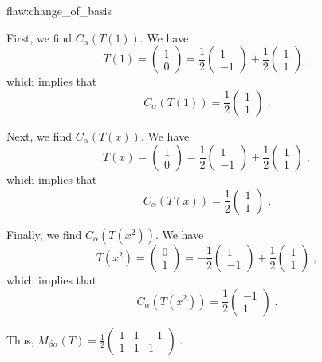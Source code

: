 \begin{flaw}{flaw:change_of_basis} %

First, we find $C_{\alpha}\left(T(1)\right)$. We have
$$T(1) = \begin{pmatrix}1 \\ 0\end{pmatrix} = \frac{1}{2}\begin{pmatrix}1 \\ -1\end{pmatrix} + \frac{1}{2}\begin{pmatrix}1 \\ 1\end{pmatrix}\;,$$
which implies that
$$C_{\alpha}\left(T(1)\right) = \frac{1}{2}\begin{pmatrix} 1 \\ 1\end{pmatrix}\;.$$

Next, we find $C_{\alpha}\left(T(x)\right)$. We have
$$T(x) = \begin{pmatrix}1 \\ 0\end{pmatrix} = \frac{1}{2}\begin{pmatrix}1 \\ -1\end{pmatrix} + \frac{1}{2}\begin{pmatrix}1 \\ 1\end{pmatrix}\;,$$
which implies that
$$C_{\alpha}\left(T(x)\right)= \frac{1}{2}\begin{pmatrix} 1 \\ 1\end{pmatrix}\;.$$

Finally, we find $C_{\alpha}\left(T(x^2)\right)$. We have
$$T(x^2) = \begin{pmatrix}0 \\ 1\end{pmatrix} = -\frac{1}{2}\begin{pmatrix}1 \\ -1\end{pmatrix} + \frac{1}{2}\begin{pmatrix}1 \\ 1\end{pmatrix}\;,$$
which implies that
$$C_{\alpha}\left(T(x^2)\right) = \frac{1}{2}\begin{pmatrix} -1 \\ 1\end{pmatrix}\;.$$

Thus, $M_{\beta\alpha}(T) = \frac{1}{2}\begin{pmatrix}1 & 1 & -1 \\ 1 & 1 & 1\end{pmatrix}\;.$
\end{flaw}

